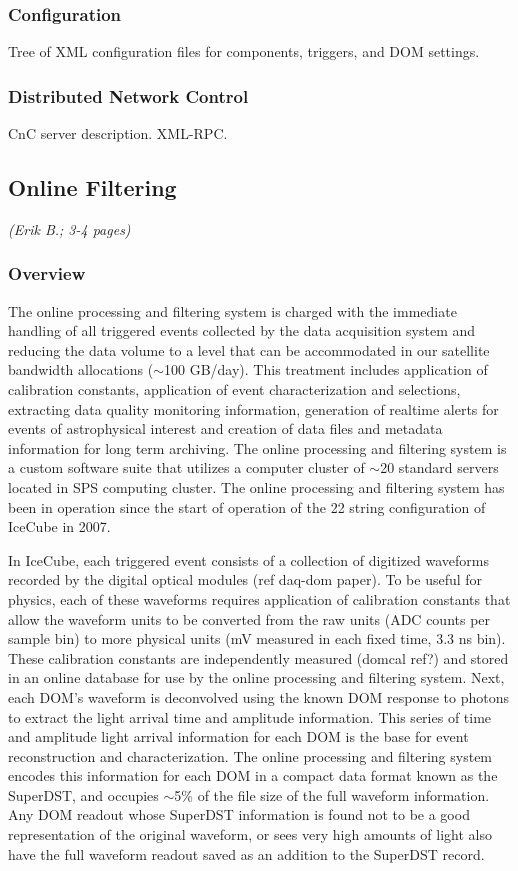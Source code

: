 \subsubsection{Configuration}

Tree of XML configuration files for components, triggers, and DOM settings.  

\subsubsection{Distributed Network Control}

CnC server description.  XML-RPC.  %

\subsection{Online Filtering}
\textsl{(Erik B.; 3-4 pages)}
\subsubsection{Overview}

The online processing and filtering system is charged with the immediate handling of all triggered events collected by the data
acquisition system and reducing the data volume to a level that can be
accommodated in our satellite bandwidth allocations ($\sim$100 GB/day).
 This treatment includes application of calibration constants, application of event characterization and selections,  
extracting data quality monitoring information, generation of realtime alerts for events of astrophysical interest
and creation of data files and metadata information for long term archiving.  The online processing and filtering system
is a custom software suite that utilizes a computer cluster of $\sim$20 standard servers located in SPS computing cluster.
The online processing and filtering system has been in operation since the
start of operation of the 22 string configuration of IceCube in 2007.

In IceCube, each triggered event consists of a collection of digitized waveforms recorded by the digital optical modules (ref daq-dom paper).
To be useful for physics, each of these waveforms requires application of calibration constants that allow the waveform units
to be converted from the raw units (ADC counts per sample bin) to more physical units (mV measured in each fixed time, 3.3 ns bin).  These
calibration constants are independently measured (domcal ref?) and stored in an online database for use by
the online processing and filtering system.  Next, each DOM's waveform is deconvolved using the known DOM response
to photons to extract the light arrival time and amplitude information.  This series of time and amplitude light arrival information
for each DOM is the base for event reconstruction and characterization.  The online processing and filtering system encodes
this information for each DOM in a compact data format known as the SuperDST, and occupies $\sim$5\%  of the file size
of the full waveform information.  Any DOM readout whose SuperDST information is found not to be a good representation of the
original waveform, or sees very high amounts of light also have the full waveform readout saved as an addition to the SuperDST record.

